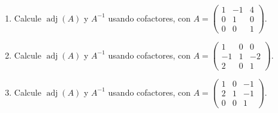 \documentclass[12pt]{article}
\theoremstyle{remark}
\newcommand{\adj}{\operatorname{adj}}
\newcounter{contadorEjercicio}
\newenvironment{listaejercicios}{\begin{enumerate}[label=\textbf{E\arabic*.},leftmargin=2.4em,itemsep=0.52em]\setcounter{enumi}{\value{contadorEjercicio}}}{\setcounter{contadorEjercicio}{\value{enumi}}\end{enumerate}}
\begin{document}
\begin{listaejercicios}
\item Calcule $\adj(A)$ y $A^{-1}$ usando cofactores, con $A=\begin{pmatrix}1&-1&4\\0&1&0\\0&0&1\end{pmatrix}$.

\item Calcule $\adj(A)$ y $A^{-1}$ usando cofactores, con $A=\begin{pmatrix}1&0&0\\-1&1&-2\\2&0&1\end{pmatrix}$.

\item Calcule $\adj(A)$ y $A^{-1}$ usando cofactores, con $A=\begin{pmatrix}1&0&-1\\2&1&-1\\0&0&1\end{pmatrix}$.

\end{listaejercicios}
\end{document}
